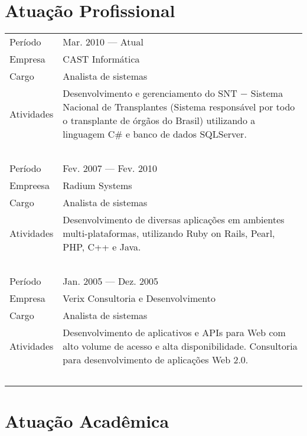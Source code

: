 \documentclass[a4paper, oneside, final]{scrartcl}
\begin{document}
\section{Atuação Profissional}

\begin{tabularx}{0.97\linewidth}{p{2cm}X}

Período		& Mar. 2010 --- Atual \\
Empresa		& CAST Informática \\
Cargo		& Analista de sistemas \\
Atividades  & Desenvolvimento e gerenciamento do SNT $-$ Sistema Nacional de Transplantes (Sistema responsável por todo o transplante de órgãos do Brasil) utilizando a linguagem C\# e banco de dados SQLServer. \\
            & \ \\

Período		& Fev. 2007 --- Fev. 2010 \\
Empreesa	& Radium Systems \\
Cargo		& Analista de sistemas \\
Atividades  & Desenvolvimento de diversas aplicações em ambientes multi-plataformas, utilizando Ruby on Rails, Pearl, PHP, C++ e Java. \\
			& \ \\

Período		& Jan. 2005 --- Dez. 2005 \\
Empresa		& Verix Consultoria e Desenvolvimento \\
Cargo		& Analista de sistemas \\
Atividades	& Desenvolvimento de aplicativos e APIs para Web com alto volume de acesso e alta disponibilidade. Consultoria para desenvolvimento de aplicações Web 2.0. \\
			& \ \\

\end{tabularx}

\section{Atuação Acadêmica}
\end{document}
